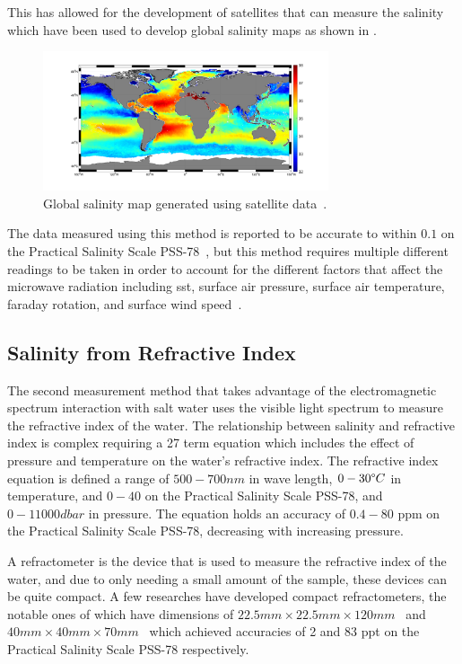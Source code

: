 This has allowed for the development of satellites that can measure the salinity which have been used to develop global salinity maps as shown in .
\begin{figure}
    \centering
    \includegraphics[width=0.75\textwidth]{Figures/salinity_distribution}
    \caption{Global salinity map generated using satellite data~\cite{esa_mapping_salty_waters_2019}.}
    \label{fig:satellite_salinity_map} %
\end{figure}
The data measured using this method is reported to be accurate to within $0.1$ on the Practical Salinity Scale PSS-78~\cite{yueh_microwave_salinity_error_sources_2001}, but this method requires multiple different readings to be taken in order to account for the different factors that affect the microwave radiation including \gls{sst}, surface air pressure, surface air temperature, faraday rotation, and surface wind speed~\cite{yueh_microwave_salinity_error_sources_2001}.

\subsection{Salinity from Refractive Index}

The second measurement method that takes advantage of the electromagnetic spectrum interaction with salt water uses the visible light spectrum to measure the refractive index of the water.
The relationship between salinity and refractive index is complex requiring a 27 term equation which includes the effect of pressure and temperature on the water's refractive index.
The refractive index equation is defined a range of $500-700nm$ in wave length, $0-30\degree C$ in temperature, and $0-40$ on the Practical Salinity Scale PSS-78, and $0-11000 dbar$ in pressure.
The equation holds an accuracy of $0.4-80$ \gls{ppm} on the Practical Salinity Scale PSS-78, decreasing with increasing pressure.~\cite{millard_index_of_refraction_algorithm_1990}

A refractometer is the device that is used to measure the refractive index of the water, and due to only needing a small amount of the sample, these devices can be quite compact.
A few researches have developed compact refractometers, the notable ones of which have dimensions of $22.5mm \times 22.5mm \times 120mm$~\cite{malarde_compact_refractometer_2008} and $40mm \times 40mm \times 70mm$~\cite{tengesdal_compact_refractometer_2012} which achieved accuracies of 2 and 83 \gls{ppt} on the Practical Salinity Scale PSS-78 respectively.

